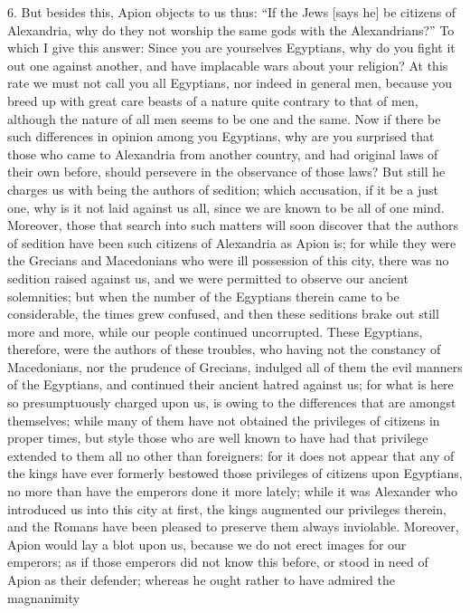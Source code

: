 6. But besides this, Apion objects to us thus: ``If the Jews [says he] be
citizens of Alexandria, why do they not worship the same gods with the
Alexandrians?'' To which I give this answer: Since you are yourselves
Egyptians, why do you fight it out one against another, and have
implacable wars about your religion? At this rate we must not call you all
Egyptians, nor indeed in general men, because you breed up with great care
beasts of a nature quite contrary to that of men, although the nature of
all men seems to be one and the same. Now if there be such differences in
opinion among you Egyptians, why are you surprised that those who came to
Alexandria from another country, and had original laws of their own
before, should persevere in the observance of those laws? But still he
charges us with being the authors of sedition; which accusation, if it be
a just one, why is it not laid against us all, since we are known to be
all of one mind. Moreover, those that search into such matters will soon
discover that the authors of sedition have been such citizens of
Alexandria as Apion is; for while they were the Grecians and Macedonians
who were ill possession of this city, there was no sedition raised against
us, and we were permitted to observe our ancient solemnities; but when the
number of the Egyptians therein came to be considerable, the times grew
confused, and then these seditions brake out still more and more, while
our people continued uncorrupted. These Egyptians, therefore, were the
authors of these troubles, who having not the constancy of Macedonians,
nor the prudence of Grecians, indulged all of them the evil manners of the
Egyptians, and continued their ancient hatred against us; for what is here
so presumptuously charged upon us, is owing to the differences that are
amongst themselves; while many of them have not obtained the privileges of
citizens in proper times, but style those who are well known to have had
that privilege extended to them all no other than foreigners: for it does
not appear that any of the kings have ever formerly bestowed those
privileges of citizens upon Egyptians, no more than have the emperors done
it more lately; while it was Alexander who introduced us into this city at
first, the kings augmented our privileges therein, and the Romans have
been pleased to preserve them always inviolable. Moreover, Apion would lay
a blot upon us, because we do not erect images for our emperors; as if
those emperors did not know this before, or stood in need of Apion as
their defender; whereas he ought rather to have admired the magnanimity
